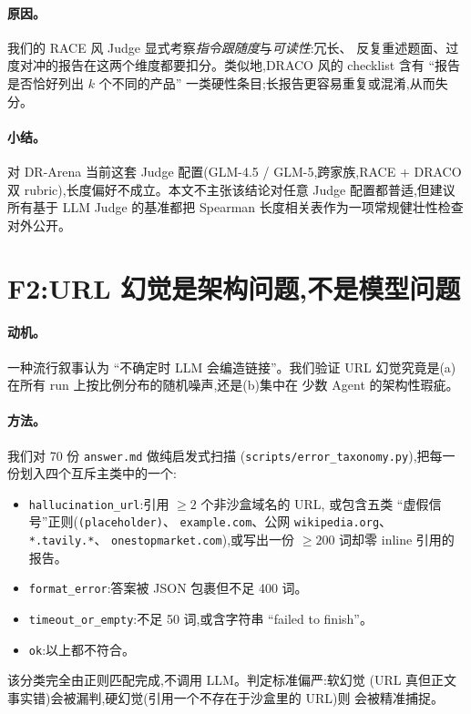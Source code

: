 \documentclass[UTF8,11pt]{ctexart}
\newcommand{\arena}{DR-Arena}
\begin{document}
\paragraph{原因。}
我们的 RACE 风 Judge 显式考察\textit{指令跟随度}与\textit{可读性}:冗长、
反复重述题面、过度对冲的报告在这两个维度都要扣分。类似地,DRACO 风的
checklist 含有 “报告是否恰好列出 $k$ 个不同的产品”
一类硬性条目;长报告更容易重复或混淆,从而失分。

\paragraph{小结。}
对 \arena{} 当前这套 Judge 配置(GLM-4.5 / GLM-5,跨家族,RACE + DRACO 双
rubric),长度偏好不成立。本文不主张该结论对任意 Judge 配置都普适,但建议
所有基于 LLM Judge 的基准都把 Spearman 长度相关表作为一项常规健壮性检查
对外公开。

\section{F2:URL 幻觉是架构问题,不是模型问题}
\label{sec:halluc}

\paragraph{动机。}
一种流行叙事认为 “不确定时 LLM 会编造链接”。我们验证
URL 幻觉究竟是(a)在所有 run 上按比例分布的随机噪声,还是(b)集中在
少数 Agent 的架构性瑕疵。

\paragraph{方法。}
我们对 70 份 \texttt{answer.md} 做纯启发式扫描
(\texttt{scripts/error\_taxonomy.py}),把每一份划入四个互斥主类中的一个:
\begin{itemize}[leftmargin=2em,itemsep=2pt,labelsep=0.5em]
  \item \texttt{hallucination\_url}:引用 $\geq 2$ 个非沙盒域名的 URL,
    或包含五类 “虚假信号”正则(\texttt{(placeholder)}、
    \texttt{example.com}、公网 \texttt{wikipedia.org}、\texttt{*.tavily.*}、
    \texttt{onestopmarket.com}),或写出一份 $\geq 200$ 词却零 inline 引用的报告。
  \item \texttt{format\_error}:答案被 JSON 包裹但不足 400 词。
  \item \texttt{timeout\_or\_empty}:不足 50 词,或含字符串
    “failed to finish”。
  \item \texttt{ok}:以上都不符合。
\end{itemize}
该分类完全由正则匹配完成,不调用 LLM。判定标准偏严:软幻觉
(URL 真但正文事实错)会被漏判,硬幻觉(引用一个不存在于沙盒里的 URL)则
会被精准捕捉。
\end{document}
